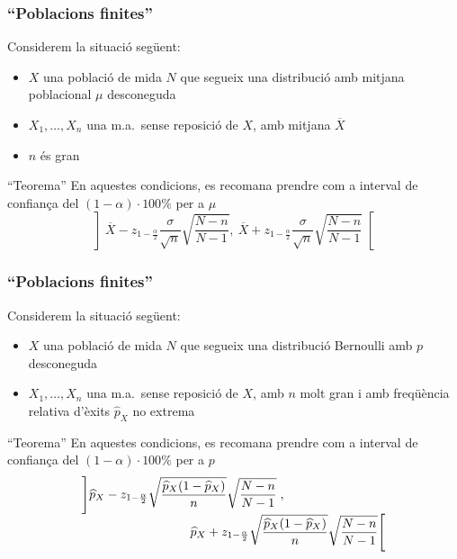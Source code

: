 \documentclass[12pt,t]{beamer}
\theoremstyle{plain}
\theoremstyle{definition}
\begin{document}
\begin{frame}
\frametitle{``Poblacions finites''}

Considerem  la situació següent:
\begin{itemize}
\item  $X$ una població de mida $N$ que segueix una distribució amb mitjana poblacional $\mu$ desconeguda

\item $X_1,\ldots,X_n$ una m.a.\ sense reposició de $X$, amb mitjana $\overline{X}$

\item  $n$ és gran 
\end{itemize}

\begin{block}{``Teorema''}
En aquestes condicions, es recomana prendre com a interval  de confiança del $(1-\alpha)\cdot 100\%$ per a $\mu$
$$
\left]\overline{X}-z_{1-\frac{\alpha}{2}}\frac{\sigma}{\sqrt{n}}\sqrt{\frac{N-n}{N-1}},\
    \overline{X}+z_{1-\frac{\alpha}{2}}\frac{\sigma}{\sqrt{n}}\sqrt{\frac{N-n}{N-1}}\right[
$$
\end{block}



\end{frame}




\begin{frame}
\frametitle{``Poblacions finites''}
\vspace*{-2ex}

Considerem  la situació següent:
\begin{itemize}
\item  $X$ una població de mida $N$ que segueix una distribució Bernoulli amb $p$ desconeguda

\item $X_1,\ldots,X_n$ una m.a.\ sense reposició de $X$, amb $n$ molt gran  i amb freqüència relativa d'èxits $\widehat{p}_{X}$ no extrema
\end{itemize}
\medskip

\begin{block}{``Teorema''}
En aquestes condicions, es recomana prendre com a interval  de confiança del $(1-\alpha)\cdot 100\%$ per a $p$
$$
\begin{array}{l}
\displaystyle \left]\widehat{p}_{X}-z_{1-\frac{\alpha}{2}}\sqrt{\frac{\widehat{p}_{X}
(1-\widehat{p}_{X})}{n}}\sqrt{\frac{N-n}{N-1}}\right.,\\[1ex]
\hspace*{3cm}\displaystyle
\left.\widehat{p}_{X}+z_{1-\frac{\alpha}{2}}\sqrt{\frac{\widehat{p}_{X}
(1-\widehat{p}_{X})}{n}}\sqrt{\frac{N-n}{N-1}}\right[
\end{array}$$
\end{block}
\end{frame}
\end{document}
